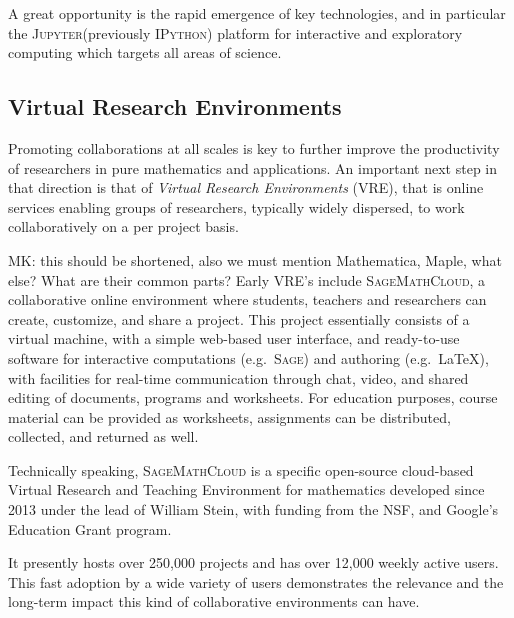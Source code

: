 \documentclass{llncs}
\newcommand{\software}[1]{\textsc{#1}\xspace}
\newcommand{\Sage}{\software{Sage}}
\newcommand{\IPython}{\software{IPython}}
\newcommand{\Jupyter}{\software{Jupyter}}
\newcommand{\SMC}{\software{SageMathCloud}}
\begin{document}
A great opportunity is the rapid emergence of key technologies, and in
particular the \Jupyter (previously \IPython) platform for interactive
and exploratory computing which targets all areas of science.

\subsection{Virtual Research Environments}

Promoting collaborations at all scales is key to further improve the
productivity of researchers in pure mathematics and applications. An
important next step in that direction is that of \emph{Virtual
Research Environments} (VRE), that is online services enabling
groups of researchers, typically widely dispersed, to work
collaboratively on a per project basis.

\begin{oldpart}{MK: this should be shortened, also we must mention Mathematica, Maple,
    what else? What are their common parts?}
  Early VRE's include \SMC, a collaborative online environment where students, teachers
  and researchers can create, customize, and share a project. This project essentially
  consists of a virtual machine, with a simple web-based user interface, and ready-to-use
  software for interactive computations (e.g.\ \Sage) and authoring (e.g.\ \LaTeX), with
  facilities for real-time communication through chat, video, and shared editing of
  documents, programs and worksheets.  For education purposes, course material can be
  provided as worksheets, assignments can be distributed, collected, and returned as well.

  Technically speaking, \SMC is a specific open-source cloud-based Virtual Research and
  Teaching Environment for mathematics developed since 2013 under the lead of William
  Stein, with funding from the NSF, and Google's Education Grant program.    

  It presently hosts over 250,000 projects and has over 12,000 weekly active users. This
  fast adoption by a wide variety of users demonstrates the relevance and the long-term
  impact this kind of collaborative environments can have.
\end{oldpart}
\end{document}
